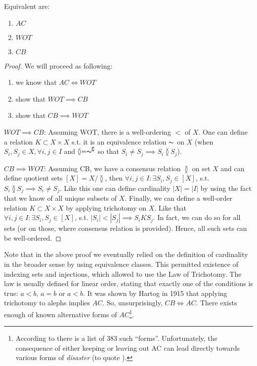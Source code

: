 \begin{lemma}
  Equivalent are:
  \begin{enumerate}
    \item $AC$
    \item $WOT$
    \item $CB$
  \end{enumerate}
\end{lemma}
\begin{proof}
  We will proceed as following:
  \begin{enumerate}
    \item we know that $AC \Longleftrightarrow WOT$
    \item show that $WOT \implies CB$
    \item show that $CB \implies WOT$
  \end{enumerate}
  $WOT \implies CB$: Assuming WOT, there is a well-ordering $<$ of $X$. One can define a relation $K \subset X \times X$ s.t. it is an equivalence relation $\thicksim$ on $X$ (when $S_i, S_j \in X, \forall i,j \in I$ and $\between = \thicksim^\complement$ so that $S_i \neq S_j \implies S_i \between S_j$).

  $CB \implies WOT$: Assuming CB, we have a consensus relation $\between$ on set $X$ and can define quotient sets $[X] = X/\between$, then $\forall i,j \in I: \exists S_i, S_j \in [X]$, s.t. $S_i \between S_j \implies S_i \neq S_j$. Like this one can define cardinality $|X| = |I|$ by using the fact that we know of all unique subsets of $X$. Finally, we can define a well-order relation $K \subset X \times X$ by applying trichotomy on $X$. Like that $\forall i,j \in I: \exists S_i, S_j \in [X]$, s.t. $|S_i| < |S_j| \implies S_{i}K S_{j}$. In fact, we can do so for all sets (or on those, where consensus relation is provided). Hence, all such sets can be well-ordered.
\end{proof}

Note that in the above proof we eventually relied on the definition of cardinality in the broader sense by using equivalence classes. This permitted existence of indexing sets and injections, which allowed to use the Law of Trichotomy. The law is usually defined for linear order, stating that exactly one of the conditions is true: $a < b$, $a = b$ or $a < b$. It was shown by Hartog in 1915 \cite{Gillman2002} that applying trichotomy to alephs implies $AC$. So, unsurprisingly, $CB \Longleftrightarrow AC$. There exists enough of known alternative forms of $AC$\footnote{According to \cite{herrlich2006ac, howard1998consequences} there is a list of 383 such “forms”. Unfortunately, the consequence of either keeping or leaving out AC can lead directly towards various forms of \textit{disaster} (to quote \cite{herrlich2006ac}).}.

